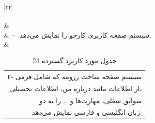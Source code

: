 \documentclass[12pt]{article}
\begin{document}
\begin{center}
\begin{table}[H]
\begin{tabular}{|rr|}
		\end{tabular}
	\end{table}

	\begin{table}[]
		\caption{جدول مورد کاربرد گسترده 24}
		\label{tab:ext-uc24}
		\begin{tabular}{|rr|}
			\hline
			                                                                                                                                                                                                                                                                                           \\ \hline
			                                                                                                                                                                                                                                                                        \\ \hline
			                                                                                                             &                                                                                                                                                         \\ \hline
			                                                                                                                         & ۰- سیستم صفحه کاربری کارجو را نمایش می‌دهد.                                                                                                                                                             \\ \hline
			               & \begin{tabular}[c]{@{}r@{}}۲- سیستم صفحه ساخت رزومه که شامل فرمی \\ از اطلاعات مانند درباره من، اطلاعات تحصیلی، \\ سوابق شغلی، مهارت‌ها و … را به دو\\  زبان انگلیسی و فارسی نمایش می‌دهد.\end{tabular} \\ \hline

\end{tabular}
\end{table}
\end{center}
\end{document}
